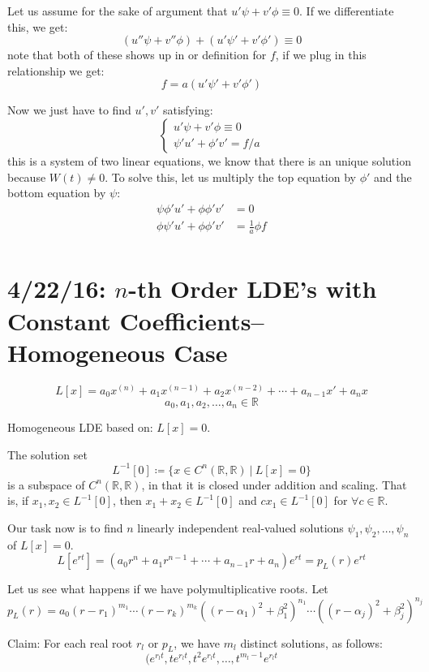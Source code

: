 \documentclass[12pt]{article}
\begin{document}
Let us assume for the sake of argument that $u'\psi + v'\phi \equiv 0$. If we
differentiate this, we get:
\[
    (u''\psi + v''\phi) + (u'\psi' + v'\phi') \equiv 0
\]
note that both of these shows up in or definition for $f$, if we plug in this
relationship we get:
\[
    f = a(u'\psi' + v'\phi')
\]

Now we just have to find $u', v'$ satisfying:
\[
    \begin{cases}
        u'\psi + v'\phi \equiv 0\\
        \psi'u' + \phi'v' = f / a
    \end{cases}
\]
this is a system of two linear equations, we know that there is an unique
solution because $W(t) \neq 0$. To solve this, let us multiply the top equation
by $\phi'$ and the bottom equation by $\psi$:
\[
\begin{aligned}
    \psi \phi'u' + \phi\phi'v' &= 0\\
    \phi \psi'u' + \phi\phi'v' &= \frac{1}{a} \phi f\\
\end{aligned}
\]

\section{4/22/16: $n$-th Order LDE's with Constant Coefficients--Homogeneous Case}
\[ L[x] = a_0x^{(n)} + a_1x^{(n-1)} + a_2x^{(n-2)}+ \cdots + a_{n-1}x' + a_nx \]
\[ a_0, a_1, a_2, \dots, a_n \in \mathbb{R} \]

Homogeneous LDE based on: $L[x] = 0$.

\begin{theorem}
The solution set \[ L^{-1}[0] \coloneqq \{ x \in C^n(\mathbb{R},\mathbb{R}) \ | \ L[x] = 0 \} \]
is a subspace of $C^n(\mathbb{R},\mathbb{R})$, in that it is closed under addition and scaling. That is, if $x_1,x_2 \in L^{-1}[0]$, then $x_1 + x_2 \in L^{-1}[0]$ and $cx_1 \in L^{-1}[0]$ for $\forall c \in \mathbb{R}$.
\end{theorem}

Our task now is to find $n$ linearly independent real-valued solutions $\psi_1,\psi_2,\dots,\psi_n$ of $L[x] = 0$. 
\[ L[e^{rt}] = (a_0r^n + a_1r^{n-1} + \cdots + a_{n-1}r + a_n)e^{rt} = p_L(r)e^{rt} \]

Let us see what happens if we have polymultiplicative roots. Let \[ p_L(r) = a_0(r-r_1)^{m_1}\cdots(r - r_k)^{m_k}((r-\alpha_1)^2 + \beta_1^2)^{n_1}\cdots ((r - \alpha_j)^2 + \beta_j^2)^{n_j} \]

Claim: For each real root $r_l$ or $p_L$, we have $m_l$ distinct solutions, as follows:
\[ (e^{r_lt}, te^{r_lt}, t^2e^{r_lt}, \dots, t^{m_l - 1}e^{r_lt} \]
\end{document}

